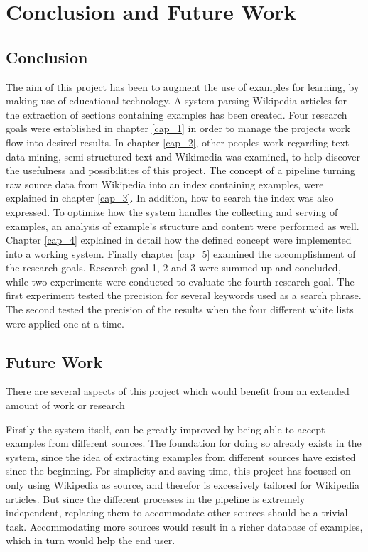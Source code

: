 
\chapter{Conclusion and Future Work}


\section{Conclusion}
The aim of this project has been to augment the use of examples for learning, by making use of educational technology. A system parsing Wikipedia articles for the extraction of sections containing examples has been created. Four research goals were established in chapter \ref{cap_1} in order to manage the projects work flow into desired results. In chapter \ref{cap_2}, other peoples work regarding text data mining, semi-structured text and Wikimedia was examined, to help discover the usefulness and possibilities of this project. The concept of a pipeline turning raw source data from Wikipedia into an index containing examples, were explained in chapter \ref{cap_3}. In addition, how to search the index was also expressed. To optimize how the system handles the collecting and serving of examples, an analysis of example's structure and content were performed as well. Chapter \ref{cap_4} explained in detail how the defined concept were implemented into a working system. Finally chapter \ref{cap_5} examined the accomplishment of the research goals. Research goal 1, 2 and 3 were summed up and concluded, while two experiments were conducted to evaluate the fourth research goal. The first experiment tested the precision for several keywords used as a search phrase. The second tested the precision of the results when the four different white lists were applied one at a time.

\section{Future Work}
There are several aspects of this project which would benefit from an extended amount of work or research

Firstly the system itself, can be greatly improved by being able to accept examples from different sources. The foundation for doing so already exists in the system, since the idea of extracting examples from different sources have existed since the beginning. For simplicity and saving time, this project has focused on only using Wikipedia as source, and therefor is excessively tailored for Wikipedia articles. But since the different processes in the pipeline is extremely independent, replacing them to accommodate other sources should be a trivial task. Accommodating more sources would result in a richer database of examples, which in turn would help the end user.

